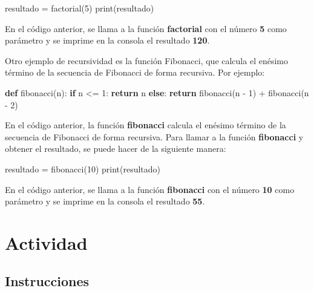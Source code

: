 \documentclass[
  a4paper,
  DIV=11,
  numbers=noendperiod,
  onepage,
  openany]{scrreprt}
\newenvironment{Shaded}{\begin{snugshade}}{\end{snugshade}}
\newcommand{\BuiltInTok}[1]{\textcolor[rgb]{0.00,0.23,0.31}{#1}}
\newcommand{\ControlFlowTok}[1]{\textcolor[rgb]{0.00,0.23,0.31}{\textbf{#1}}}
\newcommand{\DecValTok}[1]{\textcolor[rgb]{0.68,0.00,0.00}{#1}}
\newcommand{\KeywordTok}[1]{\textcolor[rgb]{0.00,0.23,0.31}{\textbf{#1}}}
\newcommand{\NormalTok}[1]{\textcolor[rgb]{0.00,0.23,0.31}{#1}}
\newcommand{\OperatorTok}[1]{\textcolor[rgb]{0.37,0.37,0.37}{#1}}
\begin{document}
\begin{Shaded}
\begin{Highlighting}[]
\NormalTok{resultado }\OperatorTok{=}\NormalTok{ factorial(}\DecValTok{5}\NormalTok{)}
\BuiltInTok{print}\NormalTok{(resultado)}
\end{Highlighting}
\end{Shaded}

En el código anterior, se llama a la función \textbf{factorial} con el
número \textbf{5} como parámetro y se imprime en la consola el resultado
\textbf{120}.

Otro ejemplo de recursividad es la función Fibonacci, que calcula el
enésimo término de la secuencia de Fibonacci de forma recursiva. Por
ejemplo:

\begin{Shaded}
\begin{Highlighting}[]
\KeywordTok{def}\NormalTok{ fibonacci(n):}
    \ControlFlowTok{if}\NormalTok{ n }\OperatorTok{\textless{}=} \DecValTok{1}\NormalTok{:}
        \ControlFlowTok{return}\NormalTok{ n}
    \ControlFlowTok{else}\NormalTok{:}
        \ControlFlowTok{return}\NormalTok{ fibonacci(n }\OperatorTok{{-}} \DecValTok{1}\NormalTok{) }\OperatorTok{+}\NormalTok{ fibonacci(n }\OperatorTok{{-}} \DecValTok{2}\NormalTok{)}
\end{Highlighting}
\end{Shaded}

En el código anterior, la función \textbf{fibonacci} calcula el enésimo
término de la secuencia de Fibonacci de forma recursiva. Para llamar a
la función \textbf{fibonacci} y obtener el resultado, se puede hacer de
la siguiente manera:

\begin{Shaded}
\begin{Highlighting}[]
\NormalTok{resultado }\OperatorTok{=}\NormalTok{ fibonacci(}\DecValTok{10}\NormalTok{)}
\BuiltInTok{print}\NormalTok{(resultado)}
\end{Highlighting}
\end{Shaded}

En el código anterior, se llama a la función \textbf{fibonacci} con el
número \textbf{10} como parámetro y se imprime en la consola el
resultado \textbf{55}.

\chapter{Actividad}\label{actividad-3}

\section{Instrucciones}\label{instrucciones-3}
\end{document}
